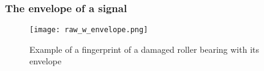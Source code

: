 \begin{frame}
    \frametitle{The envelope of a signal}
    \small
    
    \begin{figure}
        \centering
        \texttt{[image: raw\_w\_envelope.png]}
        \caption{Example of a fingerprint of a damaged roller bearing with its envelope}
        \label{fig:spectrum}
    \end{figure}
   
\end{frame}